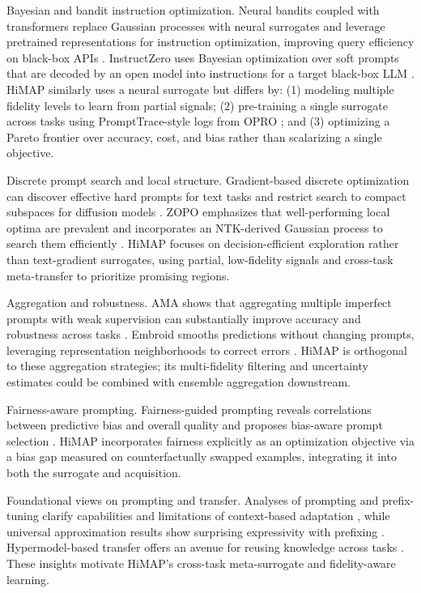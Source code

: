 \documentclass{article}
\begin{document}
Bayesian and bandit instruction optimization. Neural bandits coupled with transformers replace Gaussian processes with neural surrogates and leverage pretrained representations for instruction optimization, improving query efficiency on black-box APIs \cite{lin-2023-use}. InstructZero uses Bayesian optimization over soft prompts that are decoded by an open model into instructions for a target black-box LLM \cite{chen-2023-instructzero}. HiMAP similarly uses a neural surrogate but differs by: (1) modeling multiple fidelity levels to learn from partial signals; (2) pre-training a single surrogate across tasks using PromptTrace-style logs from OPRO \cite{yang-2023-large}; and (3) optimizing a Pareto frontier over accuracy, cost, and bias rather than scalarizing a single objective.

Discrete prompt search and local structure. Gradient-based discrete optimization can discover effective hard prompts for text tasks \cite{wen-2023-hard} and restrict search to compact subspaces for diffusion models \cite{wang-2024-discrete}. ZOPO emphasizes that well-performing local optima are prevalent and incorporates an NTK-derived Gaussian process to search them efficiently \cite{hu-2024-localized,jacot-2018-neural}. HiMAP focuses on decision-efficient exploration rather than text-gradient surrogates, using partial, low-fidelity signals and cross-task meta-transfer to prioritize promising regions.

Aggregation and robustness. AMA shows that aggregating multiple imperfect prompts with weak supervision can substantially improve accuracy and robustness across tasks \cite{arora-2022-ask}. Embroid smooths predictions without changing prompts, leveraging representation neighborhoods to correct errors \cite{guha-2023-embroid}. HiMAP is orthogonal to these aggregation strategies; its multi-fidelity filtering and uncertainty estimates could be combined with ensemble aggregation downstream.

Fairness-aware prompting. Fairness-guided prompting reveals correlations between predictive bias and overall quality and proposes bias-aware prompt selection \cite{ma-2023-fairness}. HiMAP incorporates fairness explicitly as an optimization objective via a bias gap measured on counterfactually swapped examples, integrating it into both the surrogate and acquisition.

Foundational views on prompting and transfer. Analyses of prompting and prefix-tuning clarify capabilities and limitations of context-based adaptation \cite{petrov-2023-when}, while universal approximation results show surprising expressivity with prefixing \cite{petrov-2024-prompting}. Hypermodel-based transfer offers an avenue for reusing knowledge across tasks \cite{phang-2022-hypertuning}. These insights motivate HiMAP's cross-task meta-surrogate and fidelity-aware learning.
\end{document}
